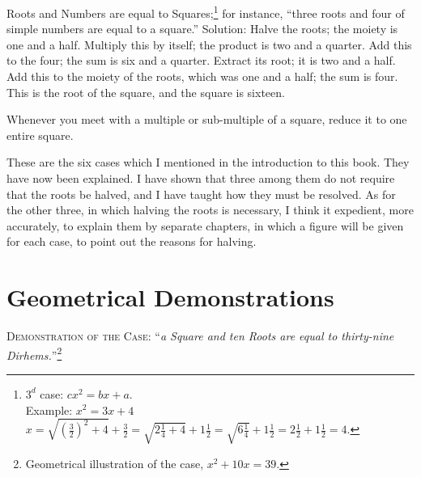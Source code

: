 Roots and Numbers are equal to Squares;\footnote{$3^{d}$ case: $cx^2 = bx + a$.\\Example: $x^2 = 3x + 4$\\$x = \sqrt{(\frac{3}{2})^2 + 4} + \frac{3}{2} = \sqrt{2\frac{1}{4} + 4} + 1\frac{1}{2} = \sqrt{6\frac{1}{4}} + 1\frac{1}{2} = 2\frac{1}{2} + 1\frac{1}{2} = 4$.} for instance, ``three roots and four of simple numbers are equal to a square.'' Solution: Halve the roots; the moiety is one and a half. Multiply this by itself; the product is two and a quarter. Add this to the four; the sum is six and a quarter. Extract its root; it is two and a half. Add this to the moiety of the roots, which was one and a half; the sum is four. This is the root of the square, and the square is sixteen.

Whenever you meet with a multiple or sub-multiple of a square, reduce it to one entire square.

These are the six cases which I mentioned in the introduction to this book. They have now been explained. I have shown that three among them do not require that the roots be halved, and I have taught how they must be resolved. As for the other three, in which halving the roots is necessary, I think it expedient, more accurately, to explain them by separate chapters, in which a figure will be given for each case, to point out the reasons for halving.

\clearpage

\section*{Geometrical Demonstrations}

\lettrine{D}{emonstration of the Case:} ``\textit{a Square and ten Roots are equal to thirty-nine Dirhems.}''\footnote{Geometrical illustration of the case, $x^2 + 10x = 39$.}

